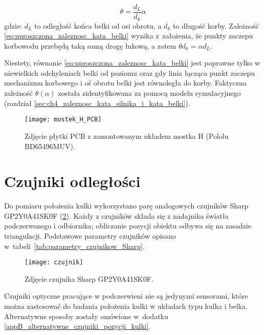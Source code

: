 \begin{equation}\label{eq:uproszczona_zaleznosc_kata_belki}
    \theta = \frac{d_L}{d_k} \alpha
\end{equation}
gdzie: $d_L$ to odległość końca belki od osi obrotu, a $d_k$ to długość korby. Zależność \eqref{eq:uproszczona_zaleznosc_kata_belki} wynika z~założenia, że punkty zaczepu korbowodu przebędą taką samą drogę łukową, a zatem $\theta d_k = \alpha d_L$.

Niestety, równanie \eqref{eq:uproszczona_zaleznosc_kata_belki} jest poprawne tylko w niewielkich odchyleniach belki od poziomu oraz gdy linia łącząca punkt zaczepu mechanizmu korbowego i oś obrotu belki jest równoległa do korby. Faktyczna zależność $\theta(\alpha)$ została zidentyfikowana za pomocą modelu symulacyjnego (rozdział \ref{sec:ch4_zaleznosc_kata_silnika_i_kata_belki}).

\begin{figure}[H]
    \centering
    \texttt{[image: mostek\_H\_PCB]}
    \caption{Zdjęcie płytki PCB z zamontowanym układem mostka H (Pololu BD65496MUV).}
    \label{fig:mostek_H_PCB}
\end{figure}

\section{Czujniki odległości}
\label{sec:ch3_czujniki_odleglosci}

Do pomiaru położenia kulki wykorzystano parę analogowych czujników Sharp GP2Y0A41SK0F (\cref{fig:czujnik_sharp}). Każdy z czujników składa się z nadajnika światła podczerwonego i odbiornika; obliczanie pozycji obiektu odbywa się na zasadzie triangulacji. Podstawowe parametry czujników opisano w~tabeli~\ref{tab:parametry_czujnikow_Sharp}.

\begin{figure}[h]
    \centering
    \texttt{[image: czujnik]}
    \caption{Zdjęcie czujnika Sharp GP2Y0A41SK0F.}
    \label{fig:czujnik_sharp}
\end{figure}

Czujniki optyczne pracujące w podczerwieni nie są jedynymi sensorami, które można zastosować do badania położenia kulki w układach typu kulka i belka. Alternatywne sposoby zostały omówione w~dodatku \ref{appB_alternatywne_czujniki_pozycji_kulki}.

